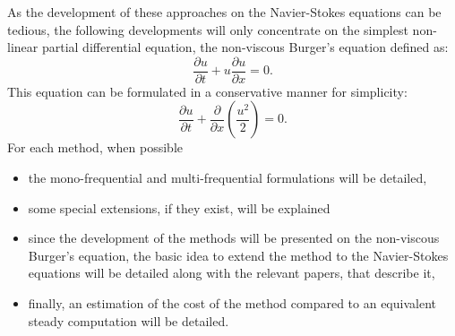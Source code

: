 As the development of these approaches on the Navier-Stokes equations
can be tedious, the following developments 
will only concentrate on the simplest
non-linear partial differential equation, 
the non-viscous Burger's equation defined as:
\begin{equation}
  \frac{\partial u}{\partial t} + 
  u \frac{\partial u}{\partial x} = 
  0.
  \label{eq:sm_nonlinear_convection}
\end{equation}
This equation can be formulated in a conservative manner for simplicity:
\begin{equation}
  \frac{\partial u}{\partial t} + 
  \frac{\partial}{\partial x} \left( \frac{u^2}{2} \right) = 
  0.
  \label{eq:sm_nonlinear_convection_conservative}
\end{equation}
For each method, when possible
\begin{itemize} \itemsep0pt \parskip0pt
  \item the mono-frequential and multi-frequential 
  formulations will be detailed,
  \item some special extensions, if they exist, will be explained
  \item since the development of the methods will be 
  presented on the non-viscous 
  Burger's equation, 
  the basic idea to extend the method to the Navier-Stokes
  equations will be detailed along with the relevant papers,
  that describe it,
  \item finally, an estimation of the cost of the method 
  compared to an equivalent steady computation will be detailed.
\end{itemize}
